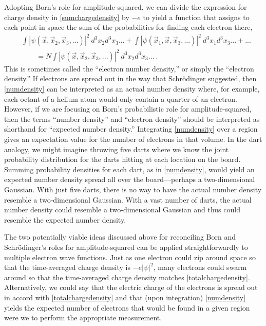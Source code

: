 \documentclass[12pt,onecolumn,secnumarabic,amsmath,amssymb,balancelastpage,nofootinbib]{article}
\begin{document}
Adopting Born's role for amplitude-squared, we can divide the expression for charge density in \eqref{sumchargedensity} by $-e$ to yield a function that assigns to each point in space the sum of the probabilities for finding each electron there,
\begin{align}
&\int{|\psi(\vec{x},\vec{x}_2, \vec{x}_3, ...)|^2 \ d^3 x_2 d^3 x_3 ...} + \int{|\psi(\vec{x}_1,\vec{x}, \vec{x}_3, ...)|^2 \ d^3 x_1 d^3 x_3 ...}+ ...
\nonumber
\\
&\quad\quad = N \int{|\psi(\vec{x},\vec{x}_2, \vec{x}_3, ...)|^2 \ d^3 x_2 d^3 x_3 ...}
\ .
\label{numdensity}
\end{align}
This is sometimes called the ``electron number density,'' or simply the ``electron density.''  If electrons are spread out in the way that Schr\"{o}dinger suggested, then \eqref{numdensity} can be interpreted as an actual number density where, for example, each octant of a helium atom would only contain a quarter of an electron.  However, if we are focusing on Born's probabilistic role for amplitude-squared, then the terms ``number density'' and ``electron density'' should be interpreted as shorthand for ``expected number density.''  Integrating \eqref{numdensity} over a region gives an expectation value for the number of electrons in that volume.  In the dart analogy, we might imagine throwing five darts where we know the joint probability distribution for the darts hitting at each location on the board.  Summing probability densities for each dart, as in \eqref{numdensity}, would yield an expected number density spread all over the board---perhaps a two-dimensional Gaussian.  With just five darts, there is no way to have the actual number density resemble a two-dimensional Gaussian.  With a vast number of darts, the actual number density could resemble a two-dimensional Gaussian and thus could resemble the expected number density.

The two potentially viable ideas discussed above for reconciling Born and Schr\"{o}dinger's roles for amplitude-squared can be applied straightforwardly to multiple electron wave functions.  Just as one electron could zip around space so that the time-averaged charge density is $-e|\psi|^2$, many electrons could swarm around so that the time-averaged charge density matches \eqref{totalchargedensity}.  Alternatively, we could say that the electric charge of the electrons is spread out in accord with \eqref{totalchargedensity} and that (upon integration) \eqref{numdensity} yields the expected number of electrons that would be found in a given region were we to perform the appropriate measurement.
\end{document}

